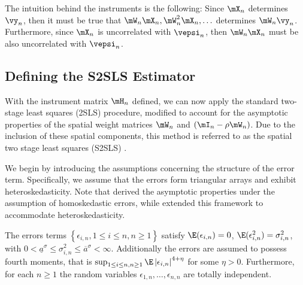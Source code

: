 \documentclass[english,12pt]{book}\usepackage[]{graphicx}\usepackage[]{xcolor}
\begin{document}
\begin{remark}
The intuition behind the instruments is the following: Since $\mX_n$ determines $\vy_n$, then it must be true that $\mW_n\mX_n, \mW^2_n\mX_n, \ldots$ determines $\mW_n\vy_n$. Furthermore, since $\mX_n$ is uncorrelated with $\vepsi_n$, then $\mW_n\mX_n$ must be also uncorrelated with $\vepsi_n$.
\end{remark}

\subsection{Defining the S2SLS Estimator}

With the instrument matrix $\mH_n$ defined, we can now apply the standard two-stage least squares (2SLS) procedure, modified to account for the asymptotic properties of the spatial weight matrices $\mW_n$ and $(\mI_n - \rho\mW_n)$. Due to the inclusion of these spatial components, this method is referred to as the spatial two stage least squares (S2SLS) \citep{kelejian1998generalized}. 

We begin by introducing the assumptions concerning the structure of the error term. Specifically, we assume that the errors form triangular arrays and exhibit heteroskedasticity. Note that \cite{kelejian1998generalized} derived the asymptotic properties under the assumption of homoskedastic errors, while \cite{kelejian2010specification} extended this framework to accommodate heteroskedasticity. 



\begin{assumption}\label{assu:errors_triang}
The errors terms $\left\lbrace \epsilon_{i,n}, 1 \leq i \leq n, n\geq 1\right\rbrace$ satisfy $\E(\epsilon_{i,n})= 0$, $\E(\epsilon_{i,n}^2) = \sigma^2_{i,n}$, with $0 < \underline{a}^\sigma \leq \sigma^2_{i,n}\leq \overline{a}^\sigma<\infty$. Additionally the errors are assumed to possess fourth moments, that is $\sup_{1\leq i \leq n, n\geq 1}\E\left|\epsilon_{i, n}\right|^{4 + \eta}$ for some $\eta > 0$.  Furthermore, for each $n\geq 1$ the random variables $\epsilon_{1, n}, \ldots, \epsilon_{n, n}$ are totally independent. 
\end{assumption}
\end{document}
